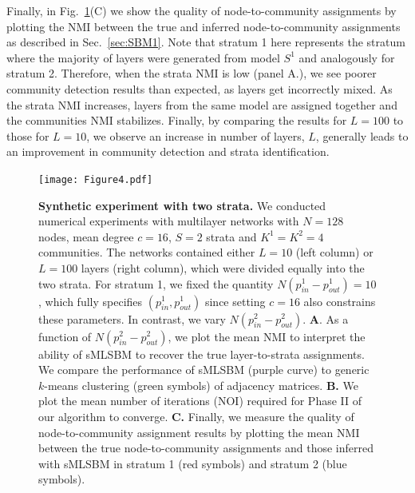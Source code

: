 {%
%
Finally, in Fig.~\ref{fig:saray}(C) we show the quality of node-to-community assignments 
by plotting the NMI between the true and inferred node-to-community assignments as described in Sec.~\ref{sec:SBM1}. Note that stratum 1 here represents the stratum where the majority of layers were generated from model $S^{1}$ and analogously for stratum 2. Therefore, when the strata NMI is low (panel A.), we see poorer community detection results than expected, as layers get incorrectly mixed. As the strata NMI increases, layers from the same model are assigned together and the communities NMI stabilizes. 
Finally, by comparing the results for $L=100$ to those for $L=10$, we observe an increase in number of layers, $L$, generally leads to an improvement in community detection and strata identification.\\


\begin{figure}
\begin{center}
\texttt{[image: Figure4.pdf]}

\caption{
{\bf Synthetic experiment with two strata.} We conducted numerical experiments with multilayer networks with $N=128$ nodes, mean degree $c=16$, $S=2$ strata and $K^1=K^2=4$ communities. The networks contained either $L=10$ (left column) or $L=100$ layers (right column), which were divided equally into the two strata. For stratum 1, we fixed the quantity $N(p_{{in}}^{1}-p_{{out}}^{1})=10$, which fully specifies $(p_{{in}}^{1},p_{{out}}^{1})$ since setting $c=16$ also constrains these parameters. In contrast, we vary $N(p_{{in}}^{2}-p_{{out}}^{2})$.
%
{\bf A}. As a function of $N(p_{{in}}^{2}-p_{{out}}^{2})$, we plot the mean NMI to interpret the ability of sMLSBM to recover the true layer-to-strata assignments. We compare the performance of sMLSBM (purple curve) to generic $k$-means clustering (green symbols) of adjacency matrices. 
{\bf B.} We plot the mean number of iterations (NOI) required for Phase II of our algorithm to converge.
{\bf C.} Finally, we measure the quality of node-to-community assignment results by plotting the mean NMI between the true node-to-community assignments and those inferred with sMLSBM in stratum 1 (red symbols) and stratum 2 (blue symbols).}
\label{fig:saray}
\end{center}
\end{figure}

}
